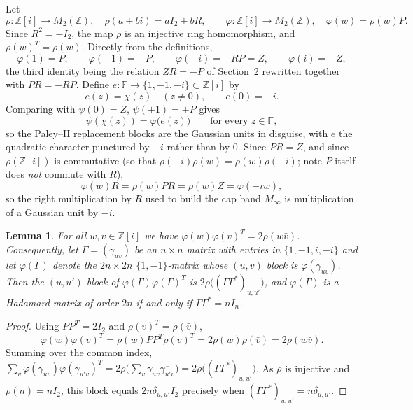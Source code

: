 \documentclass[11pt]{article}
\newtheorem{lemma}{Lemma}
\newcommand{\F}{\mathbb F}
\newcommand{\Z}{\mathbb Z}
\begin{document}
Let
\[
        \rho\colon\Z[i]\to M_2(\Z),\quad \rho(a+bi)=aI_2+bR,
        \qquad
        \varphi\colon\Z[i]\to M_2(\Z),\quad \varphi(w)=\rho(w)P .
\]
Since \(R^{2}=-I_2\), the map \(\rho\) is an injective ring homomorphism, and
\(\rho(w)^{T}=\rho(\bar w)\).  Directly from the definitions,
\[
        \varphi(1)=P,\qquad \varphi(-1)=-P,\qquad
        \varphi(-i)=-RP=Z,\qquad \varphi(i)=-Z,
\]
the third identity being the relation \(ZR=-P\) of Section~2 rewritten together
with \(PR=-RP\).  Define
\(e\colon\F\to\{1,-1,-i\}\subset\Z[i]\) by
\[
        e(z)=\chi(z)\quad(z\neq0),\qquad e(0)=-i .
        \tag{6.1}\label{eq:edef}
\]
Comparing with \(\psi(0)=Z\), \(\psi(\pm1)=\pm P\) gives
\[
        \psi(\chi(z))=\varphi\bigl(e(z)\bigr)\qquad\text{for every }z\in\F ,
        \tag{6.2}\label{eq:psiphi}
\]
so the Paley--II replacement blocks are the Gaussian units in disguise, with
\(e\) the quadratic character punctured by \(-i\) rather than by \(0\).
Since \(PR=Z\), and since \(\rho(\Z[i])\) is commutative (so that
\(\rho(-i)\rho(w)=\rho(w)\rho(-i)\); note \(P\) itself does \emph{not}
commute with \(R\)),
\[
        \varphi(w)R=\rho(w)PR=\rho(w)Z=\varphi(-iw),
        \tag{6.3}\label{eq:capR}
\]
so the right multiplication by \(R\) used to build the cap band \(M_\infty\)
is multiplication of a Gaussian unit by \(-i\).

\begin{lemma}\label{lem:double}
For all \(w,v\in\Z[i]\) we have \(\varphi(w)\varphi(v)^{T}=2\rho(w\bar v)\).
Consequently, let \(\Gamma=(\gamma_{uv})\) be an \(n\times n\) matrix with
entries in \(\{1,-1,i,-i\}\) and let \(\varphi(\Gamma)\) denote the
\(2n\times2n\) \(\{1,-1\}\)-matrix whose \((u,v)\) block is
\(\varphi(\gamma_{uv})\).  Then the \((u,u')\) block of
\(\varphi(\Gamma)\varphi(\Gamma)^{T}\) is
\(2\rho\bigl((\Gamma\Gamma^{*})_{u,u'}\bigr)\), and \(\varphi(\Gamma)\) is a
Hadamard matrix of order \(2n\) if and only if \(\Gamma\Gamma^{*}=nI_n\).
\end{lemma}

\begin{proof}
Using \(PP^{T}=2I_2\) and \(\rho(v)^{T}=\rho(\bar v)\),
\[
        \varphi(w)\varphi(v)^{T}=\rho(w)PP^{T}\rho(v)^{T}
        =2\rho(w)\rho(\bar v)=2\rho(w\bar v).
\]
Summing over the common index,
\(\sum_{v}\varphi(\gamma_{uv})\varphi(\gamma_{u'v})^{T}
 =2\rho\bigl(\sum_{v}\gamma_{uv}\overline{\gamma_{u'v}}\bigr)
 =2\rho\bigl((\Gamma\Gamma^{*})_{u,u'}\bigr)\).
As \(\rho\) is injective and \(\rho(n)=nI_2\), this block equals
\(2n\delta_{u,u'}I_2\) precisely when
\((\Gamma\Gamma^{*})_{u,u'}=n\delta_{u,u'}\).
\end{proof}
\end{document}
